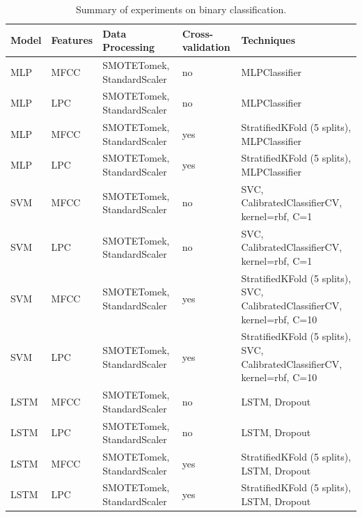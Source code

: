 \renewcommand{\arraystretch}{1.5} %
\setlength\extrarowheight{5pt} %
\begin{table}[!ht]
    \small
    \setlength\extrarowheight{2pt} %
    \begin{tabularx}{\textwidth}{>{\centering\arraybackslash}m{1.5cm} >{\centering\arraybackslash}m{1.5cm} >{\centering\arraybackslash}m{3.5cm} >{\centering\arraybackslash}m{2cm} >{\centering\arraybackslash}m{6cm}}
    \toprule
        \rowcolor{orange!10}
        \textbf{Model} & \textbf{Features} & \textbf{Data Processing} & \textbf{Cross-validation}  & \textbf{Techniques} \\
    \midrule  
    MLP & MFCC & SMOTETomek, StandardScaler & no & MLPClassifier \\
    MLP & LPC & SMOTETomek, StandardScaler & no & MLPClassifier \\
    MLP & MFCC & SMOTETomek, StandardScaler & yes & StratifiedKFold (5 splits), MLPClassifier \\
    MLP & LPC & SMOTETomek, StandardScaler & yes & StratifiedKFold (5 splits), MLPClassifier \\
    SVM & MFCC & SMOTETomek, StandardScaler & no & SVC, CalibratedClassifierCV, kernel=rbf, C=1 \\
    SVM & LPC & SMOTETomek, StandardScaler & no &  SVC, CalibratedClassifierCV, kernel=rbf, C=1\\
    SVM & MFCC & SMOTETomek, StandardScaler & yes & StratifiedKFold (5 splits), SVC, CalibratedClassifierCV, kernel=rbf, C=10 \\
    SVM & LPC & SMOTETomek, StandardScaler & yes & StratifiedKFold (5 splits), SVC, CalibratedClassifierCV, kernel=rbf, C=10 \\
    LSTM & MFCC & SMOTETomek, StandardScaler & no & LSTM, Dropout \\
    LSTM & LPC & SMOTETomek, StandardScaler & no & LSTM, Dropout \\
    LSTM & MFCC & SMOTETomek, StandardScaler & yes & StratifiedKFold (5 splits), LSTM, Dropout \\
    LSTM & LPC & SMOTETomek, StandardScaler & yes & StratifiedKFold (5 splits), LSTM, Dropout \\
    \bottomrule
    \end{tabularx}
    \vspace{10pt} 
    \caption{Summary of experiments on binary classification.}
    \label{table:binary-experiments}
\end{table}


